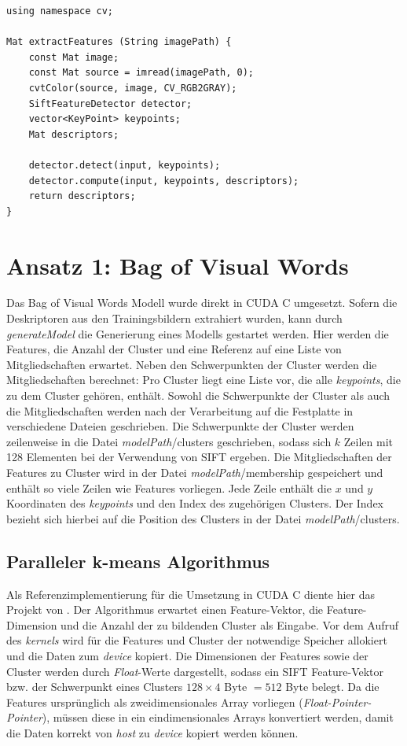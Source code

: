 \lstset{language=C}
\begin{lstlisting}
using namespace cv;

Mat extractFeatures (String imagePath) {
	const Mat image;
	const Mat source = imread(imagePath, 0);
	cvtColor(source, image, CV_RGB2GRAY);
	SiftFeatureDetector detector;
	vector<KeyPoint> keypoints;
	Mat descriptors;
	
	detector.detect(input, keypoints);
	detector.compute(input, keypoints, descriptors);
	return descriptors;
}
\end{lstlisting}

\section{Ansatz 1: Bag of Visual Words}

Das Bag of Visual Words Modell wurde direkt in CUDA C umgesetzt. Sofern die Deskriptoren aus den Trainingsbildern extrahiert wurden, kann durch \textit{generateModel} die Generierung eines Modells gestartet werden. Hier werden die Features, die Anzahl der Cluster und eine Referenz auf eine Liste von Mitgliedschaften erwartet. Neben den Schwerpunkten der Cluster werden die Mitgliedschaften berechnet: Pro Cluster liegt eine Liste vor, die alle \textit{keypoints}, die zu dem Cluster gehören, enthält. Sowohl die Schwerpunkte der Cluster als auch die Mitgliedschaften werden nach der Verarbeitung auf die Festplatte in verschiedene Dateien geschrieben. Die Schwerpunkte der Cluster werden zeilenweise in die Datei \textit{modelPath}/clusters geschrieben, sodass sich $k$ Zeilen mit 128 Elementen bei der Verwendung von SIFT ergeben. Die Mitgliedschaften der Features zu Cluster wird in der Datei \textit{modelPath}/membership gespeichert und enthält so viele Zeilen wie Features vorliegen. Jede Zeile enthält die $x$ und $y$ Koordinaten des \textit{keypoints} und den Index des zugehörigen Clusters. Der Index bezieht sich hierbei auf die Position des Clusters in der Datei \textit{modelPath}/clusters.

\subsection{Paralleler k-means Algorithmus}

Als Referenzimplementierung für die Umsetzung in CUDA C diente hier das Projekt von \todo{[REF]}. Der Algorithmus erwartet einen Feature-Vektor, die Feature-Dimension und die Anzahl der zu bildenden Cluster als Eingabe. Vor dem Aufruf des \textit{kernels} wird für die Features und Cluster der notwendige Speicher allokiert und die Daten zum \textit{device} kopiert. Die Dimensionen der Features sowie der Cluster werden durch \textit{Float}-Werte dargestellt, sodass ein SIFT Feature-Vektor bzw. der Schwerpunkt eines Clusters $128 \times 4$ Byte $= 512$ Byte belegt. Da die Features ursprünglich als zweidimensionales Array vorliegen (\textit{Float-Pointer-Pointer}), müssen diese in ein eindimensionales Arrays konvertiert werden, damit die Daten korrekt von \textit{host} zu \textit{device} kopiert werden können. 

